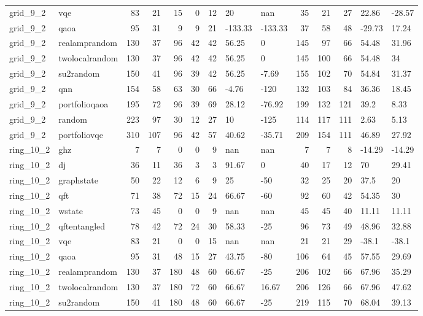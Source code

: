 \begin{longtable}{llrrrrrllrrrll}
grid\_9\_2 & vqe & 83 & 21 & 15 & 0 & 12 & 20 & nan & 35 & 21 & 27 & 22.86 & -28.57 \\
grid\_9\_2 & qaoa & 95 & 31 & 9 & 9 & 21 & -133.33 & -133.33 & 37 & 58 & 48 & -29.73 & 17.24 \\
grid\_9\_2 & realamprandom & 130 & 37 & 96 & 42 & 42 & 56.25 & 0 & 145 & 97 & 66 & 54.48 & 31.96 \\
grid\_9\_2 & twolocalrandom & 130 & 37 & 96 & 42 & 42 & 56.25 & 0 & 145 & 100 & 66 & 54.48 & 34 \\
grid\_9\_2 & su2random & 150 & 41 & 96 & 39 & 42 & 56.25 & -7.69 & 155 & 102 & 70 & 54.84 & 31.37 \\
grid\_9\_2 & qnn & 154 & 58 & 63 & 30 & 66 & -4.76 & -120 & 132 & 103 & 84 & 36.36 & 18.45 \\
grid\_9\_2 & portfolioqaoa & 195 & 72 & 96 & 39 & 69 & 28.12 & -76.92 & 199 & 132 & 121 & 39.2 & 8.33 \\
grid\_9\_2 & random & 223 & 97 & 30 & 12 & 27 & 10 & -125 & 114 & 117 & 111 & 2.63 & 5.13 \\
grid\_9\_2 & portfoliovqe & 310 & 107 & 96 & 42 & 57 & 40.62 & -35.71 & 209 & 154 & 111 & 46.89 & 27.92 \\
ring\_10\_2 & ghz & 7 & 7 & 0 & 0 & 9 & nan & nan & 7 & 7 & 8 & -14.29 & -14.29 \\
ring\_10\_2 & dj & 36 & 11 & 36 & 3 & 3 & 91.67 & 0 & 40 & 17 & 12 & 70 & 29.41 \\
ring\_10\_2 & graphstate & 50 & 22 & 12 & 6 & 9 & 25 & -50 & 32 & 25 & 20 & 37.5 & 20 \\
ring\_10\_2 & qft & 71 & 38 & 72 & 15 & 24 & 66.67 & -60 & 92 & 60 & 42 & 54.35 & 30 \\
ring\_10\_2 & wstate & 73 & 45 & 0 & 0 & 9 & nan & nan & 45 & 45 & 40 & 11.11 & 11.11 \\
ring\_10\_2 & qftentangled & 78 & 42 & 72 & 24 & 30 & 58.33 & -25 & 96 & 73 & 49 & 48.96 & 32.88 \\
ring\_10\_2 & vqe & 83 & 21 & 0 & 0 & 15 & nan & nan & 21 & 21 & 29 & -38.1 & -38.1 \\
ring\_10\_2 & qaoa & 95 & 31 & 48 & 15 & 27 & 43.75 & -80 & 106 & 64 & 45 & 57.55 & 29.69 \\
ring\_10\_2 & realamprandom & 130 & 37 & 180 & 48 & 60 & 66.67 & -25 & 206 & 102 & 66 & 67.96 & 35.29 \\
ring\_10\_2 & twolocalrandom & 130 & 37 & 180 & 72 & 60 & 66.67 & 16.67 & 206 & 126 & 66 & 67.96 & 47.62 \\
ring\_10\_2 & su2random & 150 & 41 & 180 & 48 & 60 & 66.67 & -25 & 219 & 115 & 70 & 68.04 & 39.13 \\

\end{longtable}
